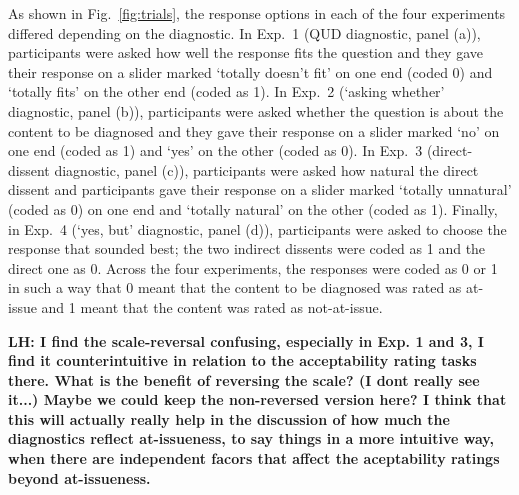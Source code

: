 \documentclass[times,linguex,xcolor]{glossa}
\newcommand{\lh}[1]{\textbf{\color{Cerulean}LH: #1}}
\begin{document}
      As shown in Fig.~\ref{fig:trials}, the response options in each of the four experiments differed depending on the diagnostic. In Exp.~1 (QUD diagnostic, panel (a)), participants were asked how well the response fits the question and they gave their response on a slider marked `totally doesn't fit' on one end (coded 0) and `totally fits' on the other end (coded as 1). In Exp.~2 (`asking whether' diagnostic, panel (b)), participants were asked whether the question is about the content to be diagnosed and they gave their response on a slider marked `no' on one end (coded as 1) and `yes' on the other (coded as 0). In Exp.~3 (direct-dissent diagnostic, panel (c)), participants were asked how natural the direct dissent and participants gave their response on a slider marked `totally unnatural' (coded as 0) on one end and `totally natural' on the other (coded as 1). Finally, in Exp.~4 (`yes, but' diagnostic, panel (d)), participants were asked to choose the response that sounded best; the two indirect dissents were coded as 1 and the direct one as 0. Across the four experiments, the responses were coded as 0 or 1 in such a way that 0 meant that the content to be diagnosed was rated as at-issue and 1 meant that the content was rated as not-at-issue.

      \lh{I find the scale-reversal confusing, especially in Exp. 1 and 3, I find it counterintuitive in relation to the acceptability rating tasks there. What is the benefit of reversing the scale? (I dont really see it...) Maybe we could keep the non-reversed version here? I think that this will actually really help in the discussion of how much the diagnostics reflect at-issueness, to say things in a more intuitive way, when there are independent facors that affect the aceptability ratings beyond at-issueness.}
\end{document}
